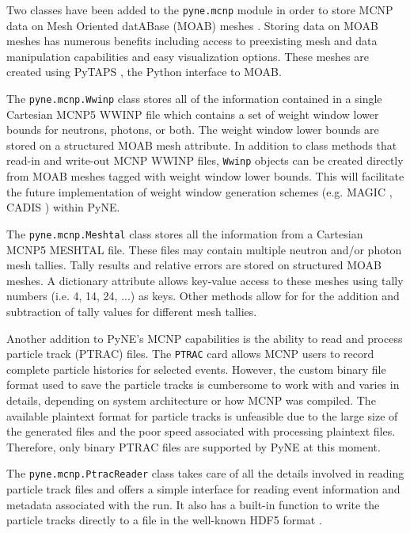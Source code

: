 \documentclass{ansconf}
\begin{document}
Two classes have been added to the \verb|pyne.mcnp| module in order to store
MCNP data on Mesh Oriented datABase (MOAB) meshes \cite{tautges_moab:_2004}.
Storing data on MOAB meshes has numerous benefits including access to preexisting
mesh and data manipulation capabilities and easy visualization options. These
meshes are created using PyTAPS \cite{pytaps}, the Python interface to MOAB.

The \verb|pyne.mcnp.Wwinp| class stores all of the information contained in a
single Cartesian MCNP5 WWINP file which contains a set of weight window lower
bounds for neutrons, photons, or both. The weight window lower bounds are
stored on a structured MOAB mesh attribute. In addition to class methods that
read-in and write-out MCNP WWINP files, \verb|Wwinp| objects can be created
directly from MOAB meshes tagged with weight window lower bounds. This will
facilitate the future implementation of weight window generation schemes (e.g.
MAGIC \cite{davis_comparison_2011}, CADIS \cite{haghighat_monte_2003}) within
PyNE.

The \verb|pyne.mcnp.Meshtal| class stores all the information from a Cartesian
MCNP5 MESHTAL file. These files may contain multiple neutron and/or photon mesh
tallies.  Tally results and relative errors are stored on structured MOAB
meshes. A dictionary attribute allows key-value access to these meshes using
tally numbers (i.e. 4, 14, 24, ...) as keys. Other methods allow for for the
addition and subtraction of tally values for different mesh tallies.

Another addition to PyNE's MCNP capabilities is the ability to read and
process particle track (PTRAC) files. The \verb|PTRAC| card allows MCNP
users to record complete particle histories for selected events. However,
the custom binary file format used to save the particle tracks is cumbersome
to work with and varies in details, depending on system architecture or
how MCNP was compiled. The available plaintext format for particle
tracks is unfeasible due to the large size of the generated files and the
poor speed associated with processing plaintext files. Therefore, only
binary PTRAC files are supported by PyNE at this moment.

The \verb|pyne.mcnp.PtracReader| class takes care of all the details
involved in reading particle track files and offers a simple interface
for reading event information and metadata associated with the run.
It also has a built-in function to write the particle tracks directly
to a file in the well-known HDF5 format \cite{hdf5}.



\end{document}

